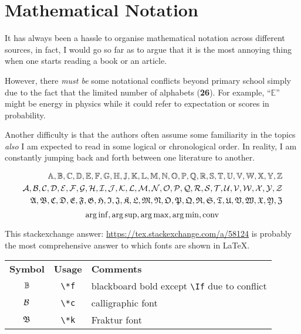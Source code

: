 \documentclass[aos,preprint]{imsart}
\begin{document}

\section{Mathematical Notation}

It has always been a hassle to organise mathematical notation across different sources,
in fact, I would go so far as to argue that it is the most annoying thing
when one starts reading a book or an article.

However, there \textit{must be} some notational conflicts beyond primary school
simply due to the fact that the limited number of alphabets (\textbf{26}).
For example, ``$\mathbb{E}$'' might be energy in physics
while it could refer to expectation or scores in probability.

Another difficulty is that the authors often assume some familiarity in the
topics
\emph{also} I am expected to read in some logical or chronological order.
In reality, I am constantly jumping back and forth between one literature to
another.

\begin{align*}
	\Af, \Bf, \Cf, \Df, \Ef, \Ff, \Gf, \Hf, \Jf, \Kf, \Lf, \Mf, \Nf, \Of, \Pf,
	\Qf, \Rf, \Sf, \Tf, \Uf, \Vf, \Wf, \Xf, \Yf, \Zf      \\
	\Ac, \Bc, \Cc, \Dc, \Ec, \Fc, \Gc, \Hc, \Ic, \Jc, \Kc, \Lc, \Mc, \Nc, \Oc,
	\Pc, \Qc, \Rc, \Sc, \Tc, \Uc, \Vc, \Wc, \Xc, \Yc, \Zc \\
	\Ak, \Bk, \Ck, \Dk, \Ek, \Fk, \Gk, \Hk, \Ik, \Jk, \Kk, \Lk, \Mk, \Nk, \Ok,
	\Pk, \Qk, \Rk, \Sk, \Tk, \Uk, \Vk, \Wk, \Xk, \Yk, \Zk
\end{align*}
$$
	\operatorname*{arg\, inf}, \operatorname*{arg\, sup}, \operatorname*{arg\, max}, \operatorname*{arg\, min}, \mathrm{conv}
$$

This stackexchange answer: \url{https://tex.stackexchange.com/a/58124}
is probably the most comprehensive answer to which fonts are shown in \LaTeX.

\begin{tabular}{ccl}
	\textbf{Symbol} & \textbf{Usage} & \textbf{Comments}                                 \\
	$\mathbb{B}$           & \verb|\*f|     & blackboard bold except \verb|\If| due to conflict \\
	$\mathcal{B}$           & \verb|\*c|     & calligraphic font                                 \\
	$\mathfrak{B}$           & \verb|\*k|     & Fraktur font                                      \\
\end{tabular}
\end{document}
